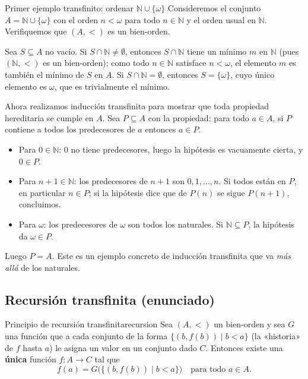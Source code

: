 \begin{ejemplo}{Primer ejemplo transfinito: ordenar $\mathbb{N} \cup \{\omega\}$}{}
Consideremos el conjunto $A = \mathbb{N} \cup \{\omega\}$ con el orden $n < \omega$ para todo $n \in \mathbb{N}$ y el orden usual en $\mathbb{N}$. Verifiquemos que $(A, <)$ es un bien-orden.

Sea $S \subseteq A$ no vacío. Si $S \cap \mathbb{N} \neq \emptyset$, entonces $S \cap \mathbb{N}$ tiene un mínimo $m$ en $\mathbb{N}$ (pues $(\mathbb{N}, <)$ es un bien-orden); como todo $n \in \mathbb{N}$ satisface $n < \omega$, el elemento $m$ es también el mínimo de $S$ en $A$. Si $S \cap \mathbb{N} = \emptyset$, entonces $S = \{\omega\}$, cuyo único elemento es $\omega$, que es trivialmente el mínimo.

Ahora realizamos inducción transfinita para mostrar que toda propiedad hereditaria se cumple en $A$. Sea $P \subseteq A$ con la propiedad: para todo $a \in A$, si $P$ contiene a todos los predecesores de $a$ entonces $a \in P$.
\begin{itemize}[leftmargin=2em]
  \item Para $0 \in \mathbb{N}$: $0$ no tiene predecesores, luego la hipótesis es vacuamente cierta, y $0 \in P$.
  \item Para $n+1 \in \mathbb{N}$: los predecesores de $n+1$ son $0,1,\ldots,n$. Si todos están en $P$, en particular $n \in P$; si la hipótesis dice que de $P(n)$ se sigue $P(n+1)$, concluimos.
  \item Para $\omega$: los predecesores de $\omega$ son todos los naturales. Si $\mathbb{N} \subseteq P$, la hipótesis da $\omega \in P$.
\end{itemize}
Luego $P = A$. Este es un ejemplo concreto de inducción transfinita que va \emph{más allá} de los naturales.
\end{ejemplo}

\subsection{Recursión transfinita (enunciado)}

\begin{teorema}{Principio de recursión transfinita}{recursion}
Sea $(A, <)$ un bien-orden y sea $G$ una función que a cada conjunto de la forma $\{(b, f(b)) \mid b < a\}$ (la «historia» de $f$ hasta $a$) le asigna un valor en un conjunto dado $C$. Entonces existe una \textbf{única} función $f: A \to C$ tal que
\[
  f(a) = G\bigl(\{(b, f(b)) \mid b < a\}\bigr) \quad \text{para todo } a \in A.
\]
\end{teorema}

